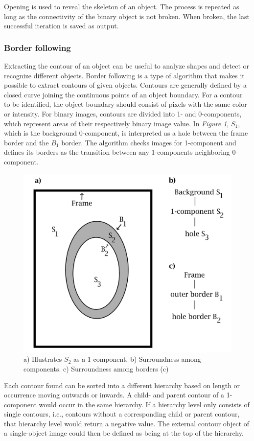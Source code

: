 \noindent Opening is used to reveal the skeleton of an object. The process is repeated as long as the connectivity of the binary object is not broken. When broken, the last successful iteration is saved as output.

\subsubsection{Border following}
Extracting the contour of an object can be useful to analyze shapes and detect or recognize different objects. Border following \cite{Suzuki} is a type of algorithm that makes it possible to extract contours of given objects. Contours are generally defined by a closed curve joining the continuous points of an object boundary. For a contour to be identified, the object boundary should consist of pixels with the same color or intensity. 
For binary images, contours are divided into 1- and 0-components, which represent areas of their respectively binary image value. In \textit{Figure \ref{fig:suzuki border}}, $S_{1}$, which is the background 0-component, is interpreted as a hole between the frame border and the $B_{1}$ border. The algorithm checks images for 1-component and defines its borders as the transition between any 1-components neighboring 0-component.

\begin{figure}[htbp]
    \centering
     \includegraphics[width=0.65\linewidth]{figures/PDF/Border_following.pdf}
    \caption{a) Illustrates $S_{2}$ as a  1-component. b) Surroundness among components. c) Surroundness among borders (c)}
    \label{fig:suzuki border}
\end{figure}

\noindent Each contour found can be sorted into a different hierarchy based on length or occurrence moving outwards or inwards. A  child- and parent contour of a 1-component would occur in the same hierarchy. If a hierarchy level only consists of single contours, i.e., contours without a corresponding child or parent contour, that hierarchy level would return a negative value.  The external contour object of a single-object image could then be defined as being at the top of the hierarchy.\\

